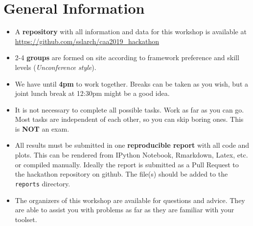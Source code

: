 \documentclass[a3, ruledsections, 8pt]{sciposter}
\begin{document}



\section{General Information}

\begin{itemize}
\item A \textbf{repository} with all information and data for this workshop is available at \newline \url{https://github.com/sslarch/caa2019_hackathon}
\item 2-4 \textbf {groups} are formed on site according to framework preference and skill levels (\textit{Unconference style}).
\item We have until \textbf{4pm} to work together. Breaks can be taken as you wish, but a joint lunch break at 12:30pm might be a good idea. 
\item It is not necessary to complete all possible tasks. Work as far as you can go. Most tasks are independent of each other, so you can skip boring ones. This is \textbf{NOT} an exam.
\item All results must be submitted in one \textbf{reproducible report} with all code and plots. This can be rendered from IPython Notebook, Rmarkdown, Latex, etc. or compiled manually. Ideally the report is submitted as a Pull Request to the hackathon repository on github. The file(s) should be added to the \verb|reports| directory.
\item The organizers of this workshop are available for questions and advice. They are able to assist you with problems as far as they are familiar with your toolset.
\end{itemize}
\end{document}
